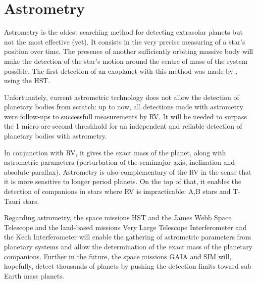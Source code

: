 \documentclass[dvips,12pt,a4paper]{report}
\begin{document}
\section{Astrometry}
\label{astrometry}
Astrometry is the oldest searching method for detecting extrasolar planets but not the most effective (yet). It consists in the very precise measuring of a star's position over time. The presence of another sufficiently orbiting massive body will make the detection of the star's motion around the centre of mass of the system possible. The first detection of an exoplanet with this method was made by \citet{Benedict-2002}, using the HST. 

Unfortunately, current astrometric technology does not allow the detection of planetary bodies from scratch: up to now, all detections made with astrometry were follow-ups to successfull measurements by RV. It will be needed to surpass the 1 micro-arc-second threshhold for an independent and reliable detection of planetary bodies with astrometry.

In conjunction with RV, it gives the exact mass of the planet, along with astrometric parameters (perturbation of the semimajor axis, inclination and absolute parallax). Astrometry is also complementary of the RV in the sense that it is more sensitive to longer period planets. On the top of that, it enables the detection of companions in stars where RV is impracticable: A,B stars and T-Tauri stars.

Regarding astrometry, the space missions HST and the James Webb Space Telescope and the land-based missions Very Large Telescope Interferometer and the Kech Interferometer will enable the gathering of astrometric parameters from planetary systems and allow the determination of the exact mass of the planetary companions. Further in the future, the space missions GAIA and SIM will, hopefully, detect thousands of planets by pushing the detection limits toward sub Earth mass planets.
\end{document}
